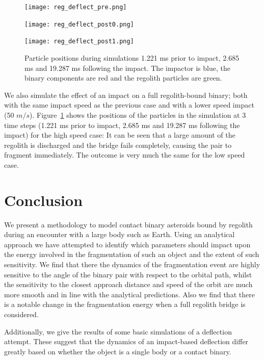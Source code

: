 \documentclass[letterpaper, preprint, paper,11pt]{AAS}	%
\begin{document}
\begin{figure}[H]
\centering
\centerline{\texttt{[image: reg\_deflect\_pre.png]}}
\centerline{\texttt{[image: reg\_deflect\_post0.png]}} 
\centerline{\texttt{[image: reg\_deflect\_post1.png]}} 
\caption{Particle positions during simulations 1.221 ms prior to impact, 2.685 ms and 19.287 ms following the impact. The impactor is blue, the binary components are red and the regolith particles are green.} 
\label{fig:boom}
\end{figure} 

\pagebreak

We also simulate the effect of an impact on a full regolith-bound binary; both with the same impact speed as the previous case and with a lower speed impact (50 $m/s$). Figure~\ref{fig:boom} shows the positions of the particles in the simulation at 3 time steps (1.221 ms prior to impact, 2.685 ms  and 19.287 ms following the impact) for the high speed case: It can be seen that a large amount of the regolith is discharged and the bridge fails completely, causing the pair to fragment immediately. The outcome is very much the same for the low speed case. 



\section{Conclusion}
We present a methodology to model contact binary asteroids bound by regolith during an encounter with a large body such as Earth. Using an analytical approach we have attempted to identify which parameters should impact upon the energy involved in the fragmentation of such an object and the extent of such sensitivity. We find that there the dynamics of the fragmentation event are highly sensitive to the angle of the binary pair with respect to the orbital path, whilst the sensitivity to the closest approach distance and speed of the orbit are much more smooth and in line with the analytical predictions. Also we find that there is a notable change in the fragmentation energy when a full regolith bridge is considered.

Additionally, we give the results of some basic simulations of a deflection attempt. These suggest that the dynamics of an impact-based deflection differ greatly based on whether the object is a single body or a contact binary. 


\end{document}

